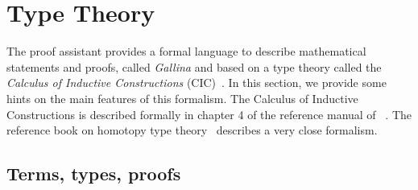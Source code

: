\chapter{Type Theory}{}
\label{ch:ttch}


The \Coq{} proof assistant provides a formal language to describe
mathematical statements and proofs, called
\emph{Gallina} and based on a type theory called the
\emph{Calculus of Inductive
  Constructions} (CIC)~\cite{coquand:huet:88,CoPa89}. In this section, we
provide some hints on the main features of this formalism. The
Calculus of Inductive Constructions is described formally in chapter 4
of the reference manual of \Coq{}~\cite{Coq:manual}. The reference book on
homotopy type theory~\cite{hottbook} describes a very close formalism.



\section{Terms, types, proofs}\label{sec:chi}



